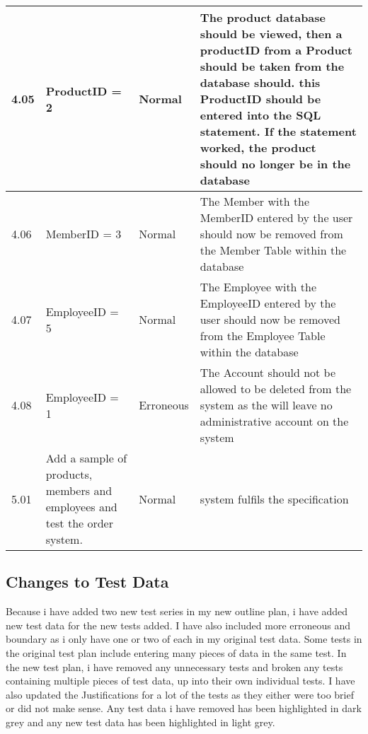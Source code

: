 \begin{flushleft}
\begin{longtable}{|p{1.5cm}|p{2.5cm}|p{2cm}|p{4.5cm}|}
	4.05 & ProductID = 2 & Normal & The product database should be viewed, then a productID from a Product should be taken from the database should. this ProductID should be entered into the SQL statement. If the statement worked, the product should no longer be in the database\\ \hline
	4.06 & MemberID = 3 & Normal & The Member with the MemberID entered by the user should now be removed from the Member Table within the database \\ \hline
	4.07 & EmployeeID = 5 & Normal & The Employee with the EmployeeID entered by the user should now be removed from the Employee Table within the database \\ \hline
	4.08 &  EmployeeID = 1 & Erroneous & The Account should not be allowed to be deleted from the system as the will leave no administrative account on the system \\ \hline
	5.01 &  Add a sample of products, members and employees and test the order system.  & Normal &system fulfils the specification \\ \hline
    \end{longtable}
\end{flushleft}

\subsection{Changes to Test Data}
	
Because i have added two new test series in my new outline plan, i have added new test data for the new tests added. I have also included more erroneous and boundary as i only have one or two of each in my original test data. Some tests in the original test plan include entering many pieces of data in the same test. In the new test plan, i have removed any unnecessary tests and broken any tests containing multiple pieces of test data, up into their own individual tests. I have also updated the Justifications for a lot of the tests as they either were too brief or did not make sense. Any test data i have removed has been highlighted in dark grey and any new test data has been highlighted in light grey.

